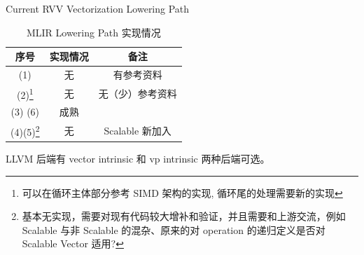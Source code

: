 \documentclass[aspectratio=169]{ctexbeamer}
\begin{document}
\begin{frame}{Current RVV Vectorization Lowering Path}
    \begin{minipage}[t]{0.5\textwidth}
        \begin{table}
            \scriptsize
            \centering
            \caption{MLIR Lowering Path 实现情况}
            \begin{tabular}{ccc}
                \toprule
                序号                                                                                                                            & 实现情况 & 备注           \\
                \midrule
                (1)                                                                                                                           & 无    & 有参考资料        \\
                (2)\footnote{\tiny 可以在循环主体部分参考 SIMD 架构的实现, 循环尾的处理需要新的实现}                                                                      & 无    & 无（少）参考资料     \\
                (3) (6)                                                                                                                       & 成熟   &              \\
                (4)(5)\footnote{\tiny 基本无实现，需要对现有代码较大增补和验证，并且需要和上游交流，例如 Scalable 与非 Scalable 的混杂、原来的对 operation 的递归定义是否对 Scalable Vector 适用?} & 无    & Scalable 新加入 \\
                \bottomrule
            \end{tabular}
        \end{table}

        \scriptsize
        LLVM 后端有 vector intrinsic 和 vp intrinsic 两种后端可选。


\end{minipage}
\end{frame}
\end{document}
